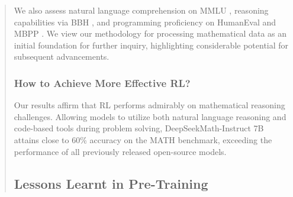 \begin{itemize}[topsep=0pt]
\begin{itemize}[topsep=0pt]
\begin{itemize}[topsep=0pt]
\begin{abstract}
\begin{itemize}[topsep=0pt]
\begin{itemize}[topsep=0pt]
\begin{algorithm}[t]
\begin{algorithmic}[1]
We also assess natural language comprehension on MMLU \citep{mmlu}, reasoning capabilities via BBH \citep{bbh}, and programming proficiency on HumanEval \citep{codex} and MBPP \citep{mbpp}. We view our methodology for processing mathematical data as an initial foundation for further inquiry, highlighting considerable potential for subsequent advancements. \subsubsection{How to Achieve More Effective RL?}
\label{sec:effec_rl}
Our results affirm that RL performs admirably on mathematical reasoning challenges. Allowing models to utilize both natural language reasoning and code-based tools during problem solving, DeepSeekMath-Instruct 7B attains close to 60\% accuracy on the MATH benchmark, exceeding the performance of all previously released open-source models. \subsection{Lessons Learnt in Pre-Training}


\end{algorithmic}
\end{algorithm}
\end{itemize}
\end{itemize}
\end{abstract}
\end{itemize}
\end{itemize}
\end{itemize}
